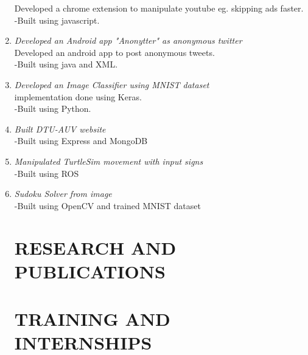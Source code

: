 \documentclass[margin]{res}
\begin{document}
\begin{enumerate}
 Developed a chrome extension to manipulate youtube eg. skipping ads faster.\\
  	-Built using javascript.\\
\item {\large{\sl Developed an Android app "Anonytter" as anonymous twitter}}\\
 Developed an android app to post anonymous tweets.\\
  	-Built using java and XML.\\
\item {\large{\sl Developed an Image Classifier using MNIST dataset}}\\
 implementation done using Keras.\\
  	-Built using Python.\\
\item {\large{\sl Built DTU-AUV website}}\\
 
  	-Built using Express and MongoDB\\
\item {\large{\sl Manipulated TurtleSim movement with input signs}}\\
 
  	-Built using ROS\\

\item {\large{\sl Sudoku Solver from image}}\\
 
  	-Built using OpenCV and trained MNIST dataset\\
\section{RESEARCH AND PUBLICATIONS } 
 
\section{    }

\section{    }
\section{    }


\section{TRAINING AND INTERNSHIPS} \begin{itemize}
 

\end{itemize}
\end{enumerate}
\end{document}

